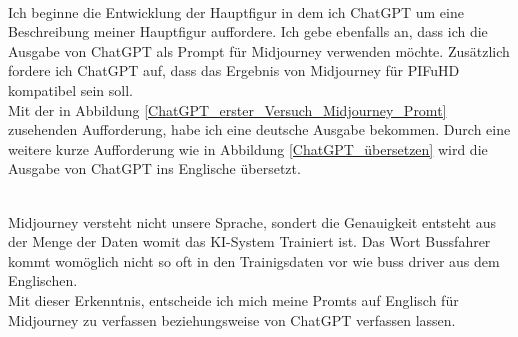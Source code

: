 \\
Ich beginne die Entwicklung der Hauptfigur in dem ich ChatGPT um eine Beschreibung meiner Hauptfigur auffordere. Ich gebe ebenfalls an, dass ich die Ausgabe von ChatGPT als Prompt für Midjourney verwenden möchte. Zusätzlich fordere ich ChatGPT auf, dass das Ergebnis von Midjourney für PIFuHD kompatibel sein soll.
\\
Mit der in Abbildung \ref{ChatGPT_erster_Versuch_Midjourney_Promt} zusehenden Aufforderung, habe ich eine deutsche Ausgabe bekommen. Durch eine weitere kurze Aufforderung wie in Abbildung \ref{ChatGPT_übersetzen} wird die Ausgabe von ChatGPT ins Englische übersetzt.

\\
Midjourney versteht nicht unsere Sprache, sondert die Genauigkeit entsteht aus der Menge der Daten womit das KI-System Trainiert ist. Das Wort Bussfahrer kommt womöglich nicht so oft in den Trainigsdaten vor wie buss driver aus dem Englischen.
\\
Mit dieser Erkenntnis, entscheide ich mich meine Promts auf Englisch für Midjourney zu verfassen beziehungsweise von ChatGPT verfassen lassen.
